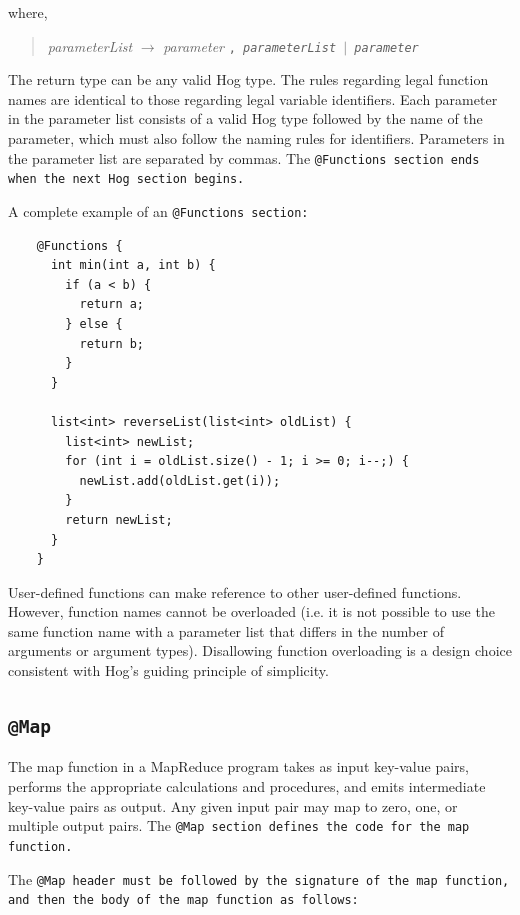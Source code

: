 \documentclass{report}
\begin{document}
where,

\begin{quotation} \emph{parameterList} $\rightarrow$ \emph{parameter} \tt , \rm
\emph{parameterList} $|$ \emph{parameter} \end{quotation}

The return type can be any valid Hog type. The rules regarding legal function
names are identical to those regarding legal variable identifiers. Each
parameter in the parameter list consists of a valid Hog type followed by the
name of the parameter, which must also follow the naming rules for identifiers.
Parameters in the parameter list are separated by commas. The \tt @Functions
\rm section ends when the next Hog section begins.

A complete example of an \tt @Functions \rm section:

\begin{verbatim}
    @Functions {
      int min(int a, int b) {
        if (a < b) {
          return a;
        } else {
          return b;
        }
      }

      list<int> reverseList(list<int> oldList) {
        list<int> newList;
        for (int i = oldList.size() - 1; i >= 0; i--;) {
          newList.add(oldList.get(i));
        }
        return newList;
      }
    }
\end{verbatim}

User-defined functions can make reference to other user-defined functions.
However, function names cannot be overloaded (i.e. it is not possible to use
the same function name with a parameter list that differs in the number of
arguments or argument types). Disallowing function overloading is a design
choice consistent with Hog's guiding principle of simplicity.


\subsection{\tt @Map \rm} %
\label{sub:tt_map_rm}

The map function in a MapReduce program takes as input key-value pairs, performs
the appropriate calculations and procedures, and emits intermediate key-value
pairs as output. Any given input pair may map to zero, one, or multiple output
pairs. The \tt @Map \rm section defines the code for the map function.

The \tt @Map \rm header must be followed by the signature of the map function, and
then the body of the map function as follows:
\end{document}
